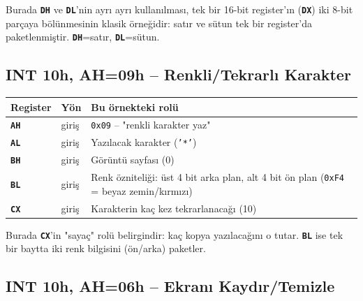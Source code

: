 \documentclass[11pt,a4paper]{article}
\newcommand{\reg}[1]{\texttt{\color{anaMavi}\textbf{#1}}}
\newcommand{\hx}[1]{\texttt{\color{turuncu}#1}}
\newcommand{\kod}[1]{\texttt{\color{koyuGri}#1}}
\begin{document}
\begin{ipucukutu}
Burada \reg{DH} ve \reg{DL}'nin ayrı ayrı kullanılması, tek bir 16-bit
register'ın (\reg{DX}) iki 8-bit parçaya bölünmesinin klasik örneğidir:
satır ve sütun tek bir register'da paketlenmiştir. \reg{DH}=satır, \reg{DL}=sütun.
\end{ipucukutu}

\subsection{INT 10h, AH=09h -- Renkli/Tekrarlı Karakter}

\begin{center}
\begin{tabularx}{\textwidth}{@{}l l >{\raggedright\arraybackslash}X@{}}
\toprule
\rowcolor{anaMavi}\color{white}\textbf{Register} & \color{white}\textbf{Yön} & \color{white}\textbf{Bu örnekteki rolü} \\
\midrule
\reg{AH} & giriş & \hx{0x09} -- "renkli karakter yaz" \\
\rowcolor{acikGri} \reg{AL} & giriş & Yazılacak karakter (\kod{'*'}) \\
\reg{BH} & giriş & Görüntü sayfası (0) \\
\rowcolor{acikGri} \reg{BL} & giriş & Renk özniteliği: üst 4 bit arka plan, alt 4 bit ön plan (\hx{0xF4} = beyaz zemin/kırmızı) \\
\reg{CX} & giriş & Karakterin kaç kez tekrarlanacağı (10) \\
\bottomrule
\end{tabularx}
\end{center}
Burada \reg{CX}'in "sayaç" rolü belirgindir: kaç kopya yazılacağını o tutar.
\reg{BL} ise tek bir baytta iki renk bilgisini (ön/arka) paketler.

\subsection{INT 10h, AH=06h -- Ekranı Kaydır/Temizle}
\end{document}
